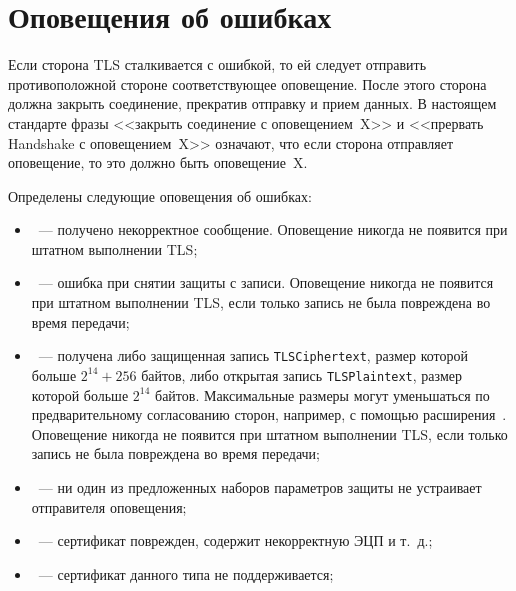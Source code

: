 \section{Оповещения об ошибках}\label{ALERT.Err}

Если сторона TLS сталкивается с ошибкой, то ей следует отправить 
противоположной стороне соответствующее оповещение. После этого сторона должна  
закрыть соединение, прекратив отправку и прием данных.
%
В настоящем стандарте фразы <<закрыть соединение с оповещением~X>> и <<прервать 
Handshake с оповещением~X>> означают, что если сторона отправляет оповещение,
то это должно быть оповещение~X.

Определены следующие оповещения об ошибках:

\begin{itemize}
\item\label{ALERT.Err.um}
~--- получено некорректное сообщение. Оповещение 
никогда не появится при штатном выполнении TLS;

\item\label{ALERT.Err.brm}
~--- ошибка при снятии защиты с записи. 
%
Оповещение никогда не появится при штатном выполнении TLS, если только запись 
не была повреждена во время передачи;

\item\label{ALERT.Err.ro}
~--- получена либо защищенная запись 
\lstinline{TLSCiphertext}, размер которой больше $2^{14} + 256$ байтов,
либо открытая запись \lstinline{TLSPlaintext}, размер которой больше $2^{14}$ 
байтов. Максимальные размеры могут уменьшаться по предварительному согласованию 
сторон, например, с помощью расширения~.
%
Оповещение никогда не появится при штатном выполнении TLS, если только запись
не была повреждена во время передачи;


\item\label{ALERT.Err.hf}
~--- ни один из предложенных наборов параметров защиты 
не устраивает отправителя оповещения; 

\item\label{ALERT.Err.bc}
~--- сертификат поврежден, содержит некорректную ЭЦП 
и т.~д.;  

\item\label{ALERT.Err.uc}
~--- сертификат данного типа не поддерживается;


\end{itemize}
